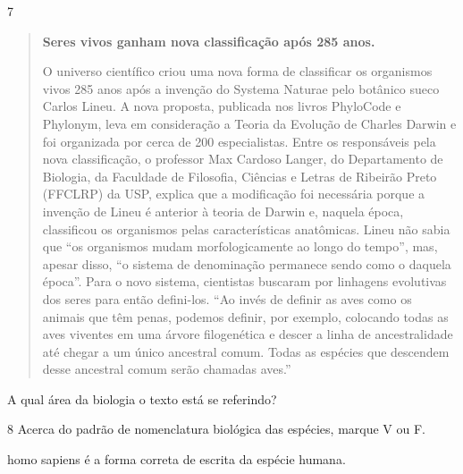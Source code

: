 {{

\num{7}

\begin{quote}
\textbf{Seres vivos ganham nova classificação após 285 anos.}

O universo científico criou uma nova forma de classificar os organismos
vivos 285 anos após a invenção do Systema Naturae pelo botânico sueco
Carlos Lineu. A nova proposta, publicada nos livros PhyloCode e
Phylonym, leva em consideração a Teoria da Evolução de Charles Darwin e
foi organizada por cerca de 200 especialistas. Entre os responsáveis
pela nova classificação, o professor Max Cardoso Langer, do Departamento
de Biologia, da Faculdade de Filosofia, Ciências e Letras de Ribeirão
Preto (FFCLRP) da USP, explica que a modificação foi necessária porque a
invenção de Lineu é anterior à teoria de Darwin e, naquela época,
classificou os organismos pelas características anatômicas. Lineu não
sabia que ``os organismos mudam morfologicamente ao longo do tempo'',
mas, apesar disso, ``o sistema de denominação permanece sendo como o
daquela época''. Para o novo sistema, cientistas buscaram por linhagens
evolutivas dos seres para então defini-los. ``Ao invés de definir as
aves como os animais que têm penas, podemos definir, por exemplo,
colocando todas as aves viventes em uma árvore filogenética e descer a
linha de ancestralidade até chegar a um único ancestral comum. Todas as
espécies que descendem desse ancestral comum serão chamadas aves.''

\end{quote}

A qual área da biologia o texto está se referindo?



\num{8}  Acerca do padrão de nomenclatura biológica das espécies, marque V ou F.

\begin{boxlist}
\item homo sapiens é a forma correta de escrita da espécie humana. 


\end{boxlist}}}
